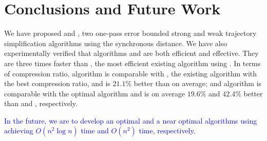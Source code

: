 \vspace{-1ex}
\section{Conclusions and Future Work}
\label{sec-conclusion}

We have proposed \cist and \cista, two one-pass error bounded strong and weak trajectory simplification algorithms using the synchronous distance.
We have also experimentally verified that algorithms \cist and \cista are both efficient and effective.
They are three times faster than \squishe, the most efficient existing \lsa algorithm using \sed.
%
In terms of compression ratio, 
algorithm \cist is {comparable} with \dps, the existing \lsa algorithm with the best compression ratio, and is $21.1\%$ better than \squishe on average; and 
algorithm \cista is comparable with the optimal algorithm and is on average $19.6\%$ and $42.4\%$ better than \dps and \squishe, respectively.

\textcolor{blue}{In the future, we are to develop an optimal and a near optimal algorithms using \sed achieving $O(n^2\log n)$ time and $O(n^2)$ time, respectively.}